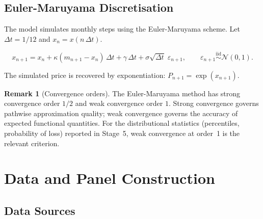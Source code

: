 \documentclass[11pt,a4paper]{article}
\theoremstyle{plain}
\theoremstyle{definition}
\newtheorem{remark}[theorem]{Remark}
\newcommand{\kap}{\kappa}
\newcommand{\sig}{\sigma}
\begin{document}
\subsection{Euler-Maruyama Discretisation}

The model simulates monthly steps using the Euler-Maruyama scheme.
Let $\Delta t = 1/12$ and $x_n = x(n\,\Delta t)$.

\begin{equation}\label{eq:EM}
  x_{n+1}
  = x_n
  + \kap(m_{n+1} - x_n)\,\Delta t
  + \gamma\,\Delta t
  + \sig\sqrt{\Delta t}\;\varepsilon_{n+1},
  \qquad
  \varepsilon_{n+1} \overset{\mathrm{iid}}{\sim} \mathcal{N}(0,1).
\end{equation}

The simulated price is recovered by exponentiation:
$P_{n+1} = \exp(x_{n+1})$.

\begin{remark}[Convergence orders]
The Euler-Maruyama method has strong convergence order $1/2$ and weak
convergence order $1$.  Strong convergence governs pathwise approximation
quality; weak convergence governs the accuracy of expected functional
quantities.  For the distributional statistics (percentiles, probability
of loss) reported in Stage~5, weak convergence at order~1 is the relevant
criterion.
\end{remark}

\section{Data and Panel Construction}

\subsection{Data Sources}
\end{document}
